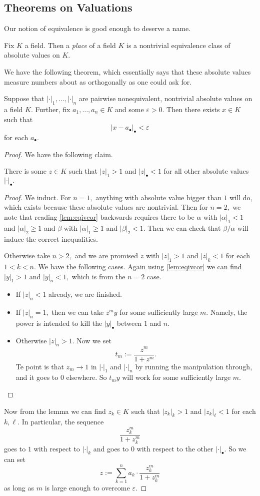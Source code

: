 \subsection{Theorems on Valuations}
Our notion of equivalence is good enough to deserve a name.
\begin{definition}[Place]
	Fix $K$ a field. Then a \textit{place} of a field $K$ is a nontrivial equivalence class of absolute values on $K.$
\end{definition}
We have the following theorem, which essentially says that these absolute values measure numbers about as orthogonally as one could ask for.
\begin{theorem}
	Suppose that $|\cdot|_1,\ldots,|\cdot|_n$ are pairwise nonequivalent, nontrivial absolute values on a field $K.$ Further, fix $a_1,\ldots,a_n\in K$ and some $\varepsilon>0.$ Then there exists $x\in K$ such that
	\[|x-a_\bullet|_\bullet<\varepsilon\]
	for each $a_\bullet.$
\end{theorem}
\begin{proof}
	We have the following claim.
	\begin{lemma}
		There is some $z\in K$ such that $|z|_1>1$ and $|z|_\bullet<1$ for all other absolute values $|\cdot|_\bullet.$
	\end{lemma}
	\begin{proof}
		We induct. For $n=1,$ anything with absolute value bigger than $1$ will do, which exists because these absolute values are nontrivial. Then for $n=2,$ we note that reading \autoref{lem:eqivcor} backwards requires there to be $\alpha$ with $|\alpha|_1<1$ and $|\alpha|_2\ge1$ and $\beta$ with $|\alpha|_1\ge1$ and $|\beta|_2<1.$ Then we can check that $\beta/\alpha$ will induce the correct inequalities.

		Otherwise take $n>2,$ and we are promised $z$ with $|z|_1>1$ and $|z|_k<1$ for each $1<k<n.$ We have the following cases. Again using \autoref{lem:eqivcor} we can find $|y|_1>1$ and $|y|_n<1,$ which is from the $n=2$ case.
		\begin{itemize}
			\item If $|z|_n<1$ already, we are finished.
			\item If $|z|_n=1,$ then we can take $z^my$ for some sufficiently large $m.$ Namely, the power is intended to kill the $|y|_\bullet$ between $1$ and $n.$
			\item Otherwise $|z|_n>1.$ Now we set
			\[t_m:=\frac{z^m}{1+z^m}.\]
			Te point is that $z_m\to1$ in $|\cdot|_1$ and $|\cdot|_n$ by running the manipulation through, and it goes to $0$ elsewhere. So $t_my$ will work for some sufficiently large $m.$
			\qedhere
		\end{itemize}
	\end{proof}
	Now from the lemma we can find $z_k\in K$ such that $|z_k|_k>1$ and $|z_k|_\ell<1$ for each $k,\ell.$ In particular, the sequence
	\[\frac{z_k^m}{1+z_k^m}\]
	goes to $1$ with respect to $|\cdot|_k$ and goes to $0$ with respect to the other $|\cdot|_\bullet.$ So we can set
	\[z:=\sum_{k=1}^na_k\cdot\frac{z_k^m}{1+z_k^m}\]
	as long as $m$ is large enough to overcome $\varepsilon.$
\end{proof}

